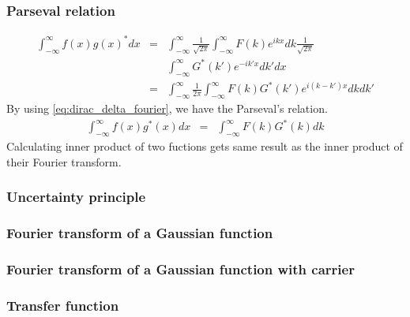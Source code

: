 \documentclass{beamer}
\begin{document}
\begin{frame}
\frametitle{Parseval relation}
\begin{eqnarray}
\int_{-\infty}^{\infty}f(x)g(x)^* dx &=&\int_{-\infty}^{\infty}  \frac{1}{\sqrt{2\pi}} \int_{-\infty}^{\infty} F(k) e^{ikx}dk \frac{1}{\sqrt{2\pi}} \nonumber \\
&&\int_{-\infty}^{\infty}G^*(k') e^{-ik'x}dk' dx\nonumber \\
&=&\int_{-\infty}^{\infty} \frac{1}{2\pi} \int_{-\infty}^{\infty} F(k)G^*(k')e^{i(k-k')x} dk dk' \nonumber
\end{eqnarray}
By using \ref{eq:dirac_delta_fourier}, we have the Parseval's relation.
\begin{eqnarray}
\int_{-\infty}^{\infty}f(x)g^*(x) dx &=& \int_{-\infty}^{\infty}F(k)G^*(k)dk
\label{eq:parseval_relation}
\end{eqnarray}
Calculating inner product of two fuctions gets same result as the inner product of their Fourier transform.
\end{frame}
\begin{frame}
\frametitle{Uncertainty principle}

\end{frame}
\begin{frame}
\frametitle{Fourier transform of a Gaussian function}

\end{frame}
\begin{frame}
\frametitle{Fourier transform of a Gaussian function with carrier}
\end{frame}
\begin{frame}
\frametitle{Transfer function}

\end{frame}
\end{document}
